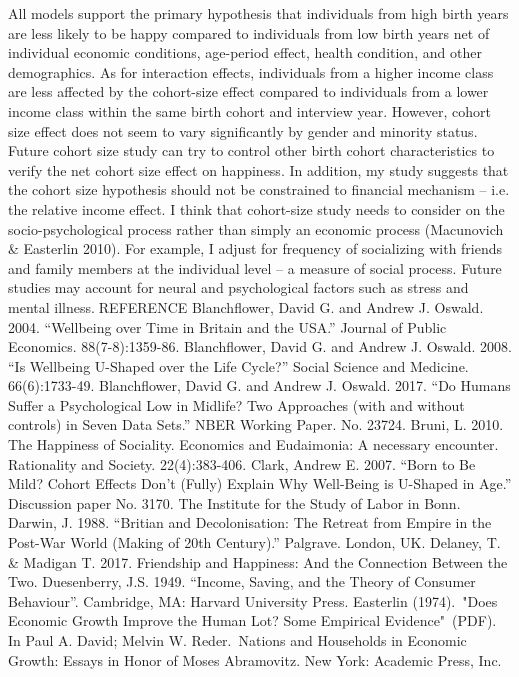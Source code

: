 All models support the primary hypothesis that individuals from high birth years are less likely to be happy compared to individuals from low birth years net of individual economic conditions, age-period effect, health condition, and other demographics. As for interaction effects, individuals from a higher income class are less affected by the cohort-size effect compared to individuals from a lower income class within the same birth cohort and interview year. However, cohort size effect does not seem to vary significantly by gender and minority status. Future cohort size study can try to control other birth cohort characteristics to verify the net cohort size effect on happiness. In addition, my study suggests that the cohort size hypothesis should not be constrained to financial mechanism – i.e. the relative income effect. I think that cohort-size study needs to consider on the socio-psychological process rather than simply an economic process (Macunovich & Easterlin 2010). For example, I adjust for frequency of socializing with friends and family members at the individual level – a measure of social process. Future studies may account for neural and psychological factors such as stress and mental illness.REFERENCE
Blanchflower, David G. and Andrew J. Oswald. 2004. “Wellbeing over Time in Britain and the USA.” Journal of Public Economics. 88(7-8):1359-86.
Blanchflower, David G. and Andrew J. Oswald. 2008. “Is Wellbeing U-Shaped over the Life Cycle?” Social Science and Medicine. 66(6):1733-49.
Blanchflower, David G. and Andrew J. Oswald. 2017. “Do Humans Suffer a Psychological Low in Midlife? Two Approaches (with and without controls) in Seven Data Sets.” NBER Working Paper. No. 23724.
Bruni, L. 2010. The Happiness of Sociality. Economics and Eudaimonia: A necessary encounter. Rationality and Society. 22(4):383-406.
Clark, Andrew E. 2007. “Born to Be Mild? Cohort Effects Don’t (Fully) Explain Why Well-Being is U-Shaped in Age.” Discussion paper No. 3170. The Institute for the Study of Labor in Bonn.
Darwin, J. 1988. “Britian and Decolonisation: The Retreat from Empire in the Post-War World (Making of 20th Century).” Palgrave. London, UK.
Delaney, T. & Madigan T. 2017. Friendship and Happiness: And the Connection Between the Two.
Duesenberry, J.S. 1949. “Income, Saving, and the Theory of Consumer Behaviour”. Cambridge, MA: Harvard University Press.
Easterlin (1974). "Does Economic Growth Improve the Human Lot? Some Empirical Evidence" (PDF). In Paul A. David; Melvin W. Reder. Nations and Households in Economic Growth: Essays in Honor of Moses Abramovitz. New York: Academic Press, Inc.
